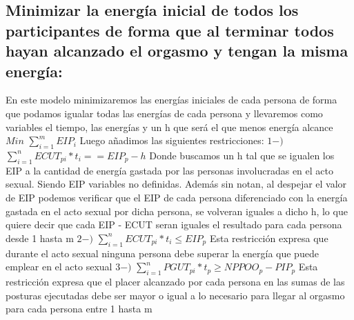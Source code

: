 \documentclass{llncs}
\begin{document}
\subsection{Minimizar la energía inicial de todos los participantes de forma que al terminar todos hayan alcanzado el orgasmo y tengan la misma energía:}
En este modelo minimizaremos las energías iniciales de cada persona de forma que podamos igualar todas las energías de cada persona y llevaremos como variables el tiempo, las energías y un h que será el que menos energía alcance
\newline
\newline
$Min$ $\sum_{i=1}^{m} EIP_{i}$
\newline
\newline
Luego añadimos las siguientes restricciones:
\newline
\newline
$1-)$ $\sum_{i=1}^{n} ECUT_{pi}*t_{i} == EIP_{p} - h$
\newline
\newline
Donde buscamos un h tal que se igualen los EIP a la cantidad de energía gastada por las personas involucradas en el acto sexual. Siendo EIP variables no definidas. Además sin notan, al despejar el valor de EIP podemos verificar que el EIP de cada persona diferenciado con la energía gastada en el acto sexual por dicha persona, se volveran iguales a dicho h, lo que quiere decir que cada EIP - ECUT seran iguales el resultado para cada persona desde 1 hasta m
\newline
\newline
$2-)$ $\sum_{i = 1}^{n} ECUT_{pi}*t_{i} \leq EIP_{p}$
\newline
\newline
Esta restricción expresa que durante el acto sexual ninguna persona debe superar la energía que puede emplear en el acto sexual
\newline
\newline
$3-)$ $\sum_{i = 1}^{n} PGUT_{pi}*t_{p} \geq NPPOO_{p} - PIP_{p}$
\newline
\newline
Esta restricción expresa que el placer alcanzado por cada persona en las sumas de las posturas ejecutadas debe ser mayor o igual a lo necesario para llegar al orgasmo para cada persona entre 1 hasta m
\end{document}
